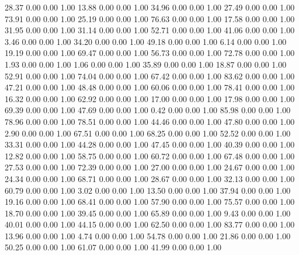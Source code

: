    28.37   0.00   0.00   1.00
   13.88   0.00   0.00   1.00
   34.96   0.00   0.00   1.00
   27.49   0.00   0.00   1.00
   73.91   0.00   0.00   1.00
   25.19   0.00   0.00   1.00
   76.63   0.00   0.00   1.00
   17.58   0.00   0.00   1.00
   31.95   0.00   0.00   1.00
   31.14   0.00   0.00   1.00
   52.71   0.00   0.00   1.00
   41.06   0.00   0.00   1.00
    3.46   0.00   0.00   1.00
   34.20   0.00   0.00   1.00
   49.18   0.00   0.00   1.00
    6.14   0.00   0.00   1.00
   19.19   0.00   0.00   1.00
   69.47   0.00   0.00   1.00
   56.73   0.00   0.00   1.00
   72.78   0.00   0.00   1.00
    1.93   0.00   0.00   1.00
    1.06   0.00   0.00   1.00
   35.89   0.00   0.00   1.00
   18.87   0.00   0.00   1.00
   52.91   0.00   0.00   1.00
   74.04   0.00   0.00   1.00
   67.42   0.00   0.00   1.00
   83.62   0.00   0.00   1.00
   47.21   0.00   0.00   1.00
   48.48   0.00   0.00   1.00
   60.06   0.00   0.00   1.00
   78.41   0.00   0.00   1.00
   16.32   0.00   0.00   1.00
   62.92   0.00   0.00   1.00
   17.00   0.00   0.00   1.00
   17.98   0.00   0.00   1.00
   69.39   0.00   0.00   1.00
   47.69   0.00   0.00   1.00
    0.42   0.00   0.00   1.00
   85.98   0.00   0.00   1.00
   78.96   0.00   0.00   1.00
   78.51   0.00   0.00   1.00
   44.46   0.00   0.00   1.00
   47.80   0.00   0.00   1.00
    2.90   0.00   0.00   1.00
   67.51   0.00   0.00   1.00
   68.25   0.00   0.00   1.00
   52.52   0.00   0.00   1.00
   33.31   0.00   0.00   1.00
   44.28   0.00   0.00   1.00
   47.45   0.00   0.00   1.00
   40.39   0.00   0.00   1.00
   12.82   0.00   0.00   1.00
   58.75   0.00   0.00   1.00
   60.72   0.00   0.00   1.00
   67.48   0.00   0.00   1.00
   27.53   0.00   0.00   1.00
   72.39   0.00   0.00   1.00
   27.00   0.00   0.00   1.00
   24.67   0.00   0.00   1.00
   24.34   0.00   0.00   1.00
   68.71   0.00   0.00   1.00
   28.67   0.00   0.00   1.00
   32.13   0.00   0.00   1.00
   60.79   0.00   0.00   1.00
    3.02   0.00   0.00   1.00
   13.50   0.00   0.00   1.00
   37.94   0.00   0.00   1.00
   19.16   0.00   0.00   1.00
   68.41   0.00   0.00   1.00
   57.90   0.00   0.00   1.00
   75.57   0.00   0.00   1.00
   18.70   0.00   0.00   1.00
   39.45   0.00   0.00   1.00
   65.89   0.00   0.00   1.00
    9.43   0.00   0.00   1.00
   40.01   0.00   0.00   1.00
   44.15   0.00   0.00   1.00
   62.50   0.00   0.00   1.00
   83.77   0.00   0.00   1.00
   13.96   0.00   0.00   1.00
    4.74   0.00   0.00   1.00
   54.78   0.00   0.00   1.00
   21.86   0.00   0.00   1.00
   50.25   0.00   0.00   1.00
   61.07   0.00   0.00   1.00
   41.99   0.00   0.00   1.00
